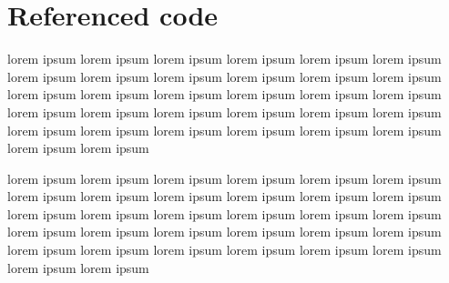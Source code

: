 \documentclass[12pt,oneside]{report}
\begin{document}

 
\cleardoublepage

\appendix
\chapter{Referenced code}
lorem ipsum lorem ipsum lorem ipsum lorem ipsum lorem ipsum lorem ipsum lorem
ipsum lorem ipsum lorem ipsum lorem ipsum lorem ipsum lorem ipsum lorem ipsum
lorem ipsum lorem ipsum lorem ipsum lorem ipsum lorem ipsum lorem ipsum lorem
ipsum lorem ipsum lorem ipsum lorem ipsum lorem ipsum lorem ipsum lorem ipsum
lorem ipsum lorem ipsum lorem ipsum lorem ipsum lorem ipsum lorem ipsum

lorem ipsum lorem ipsum lorem ipsum lorem ipsum lorem ipsum lorem ipsum lorem
ipsum lorem ipsum lorem ipsum lorem ipsum lorem ipsum lorem ipsum lorem ipsum
lorem ipsum lorem ipsum lorem ipsum lorem ipsum lorem ipsum lorem ipsum lorem
ipsum lorem ipsum lorem ipsum lorem ipsum lorem ipsum lorem ipsum lorem ipsum
lorem ipsum lorem ipsum lorem ipsum lorem ipsum lorem ipsum lorem ipsum
\end{document}
